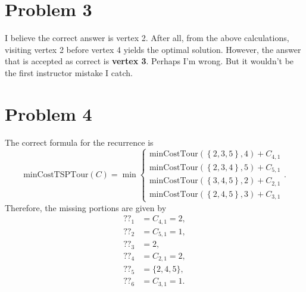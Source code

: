 \documentclass[11pt]{article}
\newcommand{\minCostTour}[2]{\mathrm{minCostTour}\left(\left\{#1\right\},#2\right)}
\begin{document}
\section*{Problem 3}
\label{sec:org1d34b8b}
I believe the correct answer is vertex 2. After all, from the above
calculations, visiting vertex 2 before vertex 4 yields the optimal solution.
However, the answer that is accepted as correct is \textbf{vertex 3}. Perhaps I'm
wrong. But it wouldn't be the first instructor mistake I catch.

\section*{Problem 4}
\label{sec:org6bca4f2}
The correct formula for the recurrence is
\begin{equation}
\mathrm{minCostTSPTour}(C)=\min
  \begin{cases}
    \minCostTour{2,3,5}{4}+C_{4,1}\\
    \minCostTour{2,3,4}{5}+C_{5,1}\\
    \minCostTour{3,4,5}{2}+C_{2,1}\\
    \minCostTour{2,4,5}{3}+C_{3,1}
  \end{cases}
.
\end{equation}
Therefore, the missing portions are given by
\begin{align}
??_1&=C_{4,1}=2,\\
??_2&=C_{5,1}=1,\\
??_3&=2,\\
??_4&=C_{2,1}=2,\\
??_5&=\{2,4,5\},\\
??_6&=C_{3,1}=1.
\end{align}
\end{document}
